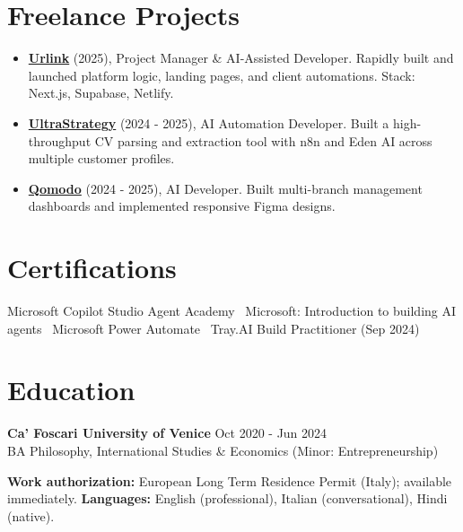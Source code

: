 \documentclass[a4paper,10pt]{article}
\begin{document}
\section{Freelance Projects}
\begin{itemize}
 \item \textbf{\href{https://smarturlink.com/}{Urlink}} (2025), Project Manager \& AI-Assisted Developer. Rapidly built and launched platform logic, landing pages, and client automations. Stack: Next.js, Supabase, Netlify.
 \item \textbf{\href{https://ultrastrategy.com}{UltraStrategy}} (2024 - 2025), AI Automation Developer. Built a high-throughput CV parsing and extraction tool with n8n and Eden AI across multiple customer profiles.
 \item \textbf{\href{https://www.qomodo.me/}{Qomodo}} (2024 - 2025), AI Developer. Built multi-branch management dashboards and implemented responsive Figma designs.
\end{itemize}

\section{Certifications}
Microsoft Copilot Studio Agent Academy \textbullet\ Microsoft: Introduction to building AI agents \textbullet\ Microsoft Power Automate \textbullet\ Tray.AI Build Practitioner (Sep 2024)

\section{Education}
\textbf{Ca' Foscari University of Venice} \hfill Oct 2020 - Jun 2024\\
BA Philosophy, International Studies \& Economics (Minor: Entrepreneurship)

\vspace{2pt}
{\small \textbf{Work authorization:} European Long Term Residence Permit (Italy); available immediately. \quad \textbf{Languages:} English (professional), Italian (conversational), Hindi (native).}
\end{document}
